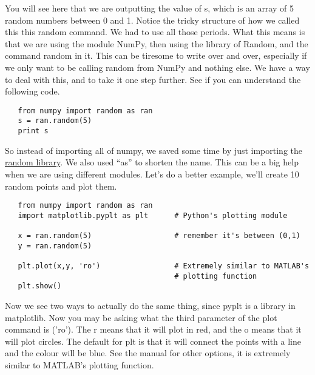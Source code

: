 \documentclass[11pt]{article}   %
\begin{document}
You will see here that we are outputting the value of s, which is an array of 5 random numbers between 0 and 1.
Notice the tricky structure of how we called this this random command.  We had to use all those periods.  What this means
is that we are using the module NumPy, then using the library of Random, and the command random in it. This can be
tiresome to write over and over, especially if we only want to be calling random from NumPy and nothing else.  We have
a way to deal with this, and to take it one step further.  See if you can understand the following code.
\begin{tcolorbox}
   \begin{lstlisting}
   from numpy import random as ran
   s = ran.random(5)
   print s
   \end{lstlisting}
\end{tcolorbox}
So instead of importing all of numpy, we saved some time by just importing the \href{http://docs.scipy.org/doc/numpy/reference/routines.random.html}{random library}.  We also used ``as'' to 
shorten the name.  This can be a big help when we are using different modules.  Let's do a better example, we'll create 10 random points and plot them.  
\begin{tcolorbox}
   \begin{lstlisting}
   from numpy import random as ran
   import matplotlib.pyplt as plt      # Python's plotting module

   x = ran.random(5)                   # remember it's between (0,1)
   y = ran.random(5)

   plt.plot(x,y, 'ro')                 # Extremely similar to MATLAB's 
                                       # plotting function
   plt.show()
   \end{lstlisting}
\end{tcolorbox}
Now we see two ways to actually do the same thing, since pyplt is a library in matplotlib.  Now you may be asking what the third parameter of the plot command is ('ro').  The r means
that it will plot in red, and the o means that it will plot circles.  The default for plt is that it will connect the points with a line and the colour will be blue.  See the manual 
for other options, it is extremely similar to MATLAB's plotting function.
\end{document}
